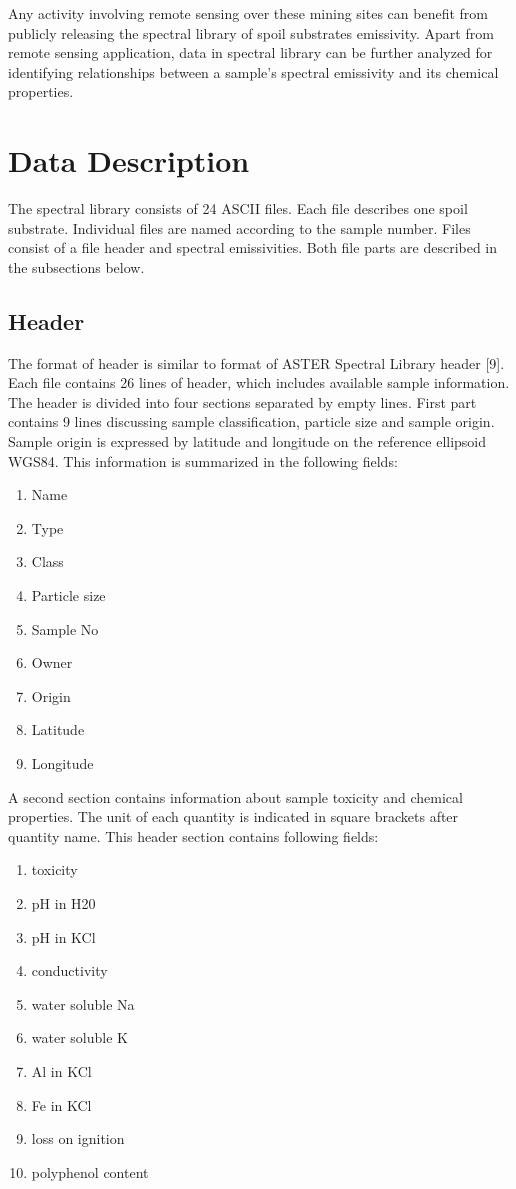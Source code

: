 Any activity involving remote sensing over these mining sites can benefit from publicly releasing the spectral library of spoil substrates emissivity. Apart from remote sensing application, data in spectral library can be further analyzed for identifying relationships between a sample’s spectral emissivity and its chemical properties.

\section{Data Description}

The spectral library consists of 24 ASCII files. Each file describes one spoil substrate. Individual files are named according to the sample number. Files consist of a file header and spectral emissivities. Both file parts are described in the subsections below.

\subsection{Header}

The format of header is similar to format of ASTER Spectral Library header [9]. Each file contains 26 lines of header, which includes available sample information. The header is divided into four sections separated by empty lines. First part contains 9 lines discussing sample classification, particle size and sample origin. Sample origin is expressed by latitude and longitude on the reference ellipsoid WGS84. This information is summarized in the following fields:

\begin{enumerate}
	\item	Name
	\item Type
	\item Class
	\item Particle size
	\item Sample No
	\item Owner
	\item Origin
	\item Latitude
	\item Longitude
\end{enumerate}

A second section contains information about sample toxicity and chemical properties. The unit of each quantity is indicated in square brackets after quantity name. This header section contains following fields:

\begin{enumerate}
	\item toxicity
	\item pH in H20
	\item pH in KCl
	\item conductivity
	\item water soluble Na
	\item water soluble K
	\item Al in KCl
	\item Fe in KCl
	\item loss on ignition
	\item polyphenol content
\end{enumerate}


